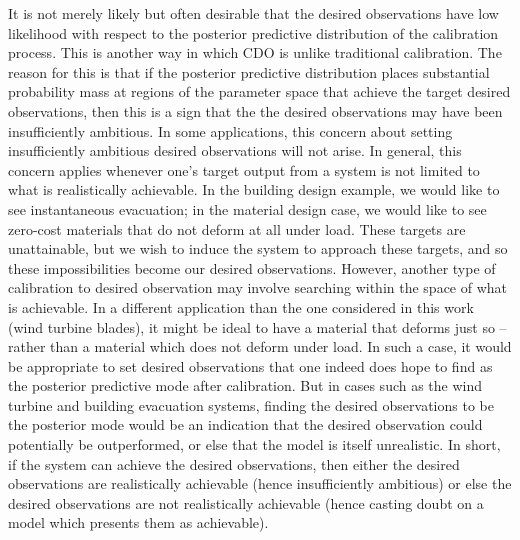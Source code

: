 \documentclass{article}
\begin{document}
It is not merely likely but often desirable that the desired observations have low likelihood with respect to the posterior predictive distribution of the calibration process. This is another way in which CDO is unlike traditional calibration. The reason for this is that if the posterior predictive distribution places substantial probability mass at regions of the parameter space that achieve the target desired observations, then this is a sign that the the desired observations may have been insufficiently ambitious. 
In some applications, this concern about setting insufficiently ambitious desired observations will not arise. In general, this concern applies whenever one's target output from a system is not limited to what is realistically achievable. In the building design example, we would like to see instantaneous evacuation; in the material design case, we would like to see zero-cost materials that do not deform at all under load. These targets are unattainable, but we wish to induce the system to approach these targets, and so these impossibilities become our desired observations. However, another type of calibration to desired observation may involve searching within the space of what is achievable. In a different application than the one considered in this work (wind turbine blades), it might be ideal to have a material that deforms just so -- rather than a material which does not deform under load. In such a case, it would be appropriate to set desired observations that one indeed does hope to find as the posterior predictive mode after calibration. But in cases such as the wind turbine and building evacuation systems, finding the desired observations to be the posterior mode would be an indication that the desired observation could potentially be outperformed, or else that the model is itself unrealistic. In short, if the system can achieve the desired observations, then either the desired observations are realistically achievable (hence insufficiently ambitious) or else the desired observations are not realistically achievable (hence casting doubt on a model which presents them as achievable).
\end{document}
